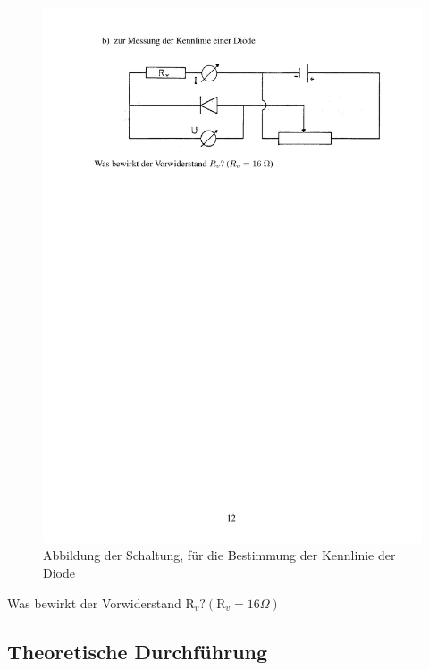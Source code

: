 \documentclass[12pt]{scrartcl}
\begin{document}
\begin{enumerate}
	\begin{figure}[htbp] 
 	 \centering
 	   \includegraphics[trim = 1mm 152mm 1mm 15mm, clip, scale = 1]{abb_versuch_6b.pdf}
  	\caption[Abbildung der Schaltung, für die Bestimmung der Kennlinie der Diode]{Abbildung der Schaltung, für die Bestimmung der Kennlinie der Diode\footnotemark}
  	\label{fig:abb_versuch_6b}
	\end{figure}
	Was bewirkt der Vorwiderstand
	$\text{R}_v? (\text{R}_v= 16\Omega)$
\end{enumerate}


\subsection{Theoretische Durchführung}
\end{document}

